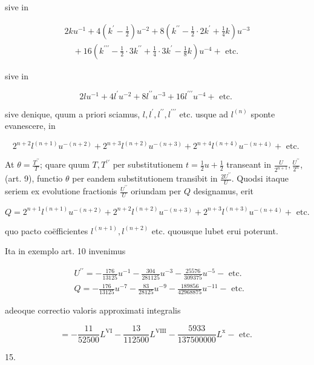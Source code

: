 \documentclass[10pt]{article}
\begin{document}
sive in

\[
\begin{gathered}
2 k u^{-1}+4\left(k^{\prime}-\frac{1}{2}\right) u^{-2}+8\left(k^{\prime \prime}-\frac{1}{2} \cdot 2 k^{\prime}+\frac{1}{4} k\right) u^{-3} \\
\quad+16\left(k^{\prime \prime \prime}-\frac{1}{2} \cdot 3 k^{\prime \prime}+\frac{1}{4} \cdot 3 k^{\prime}-\frac{1}{8} k\right) u^{-4}+\text { etc. }
\end{gathered}
\]

sive in

\[
2 l u^{-1}+4 l^{\prime} u^{-2}+8 l^{\prime \prime} u^{-3}+16 l^{\prime \prime \prime} u^{-4}+\text { etc. }
\]

sive denique, quum a priori sciamus, \(l, l^{\prime}, l^{\prime \prime}, l^{\prime \prime \prime}\) etc. usque ad \(l^{(n)}\) sponte evanescere, in

\[
2^{n+2} l^{(n+1)} u^{-(n+2)}+2^{n+3} l^{(n+2)} u^{-(n+3)}+2^{n+4} l^{(n+4)} u^{-(n+4)}+\text { etc. }
\]

At \(\theta=\frac{T^{\prime \prime}}{T}\); quare quum \(T, T^{\prime \prime}\) per substitutionem \(t=\frac{1}{2} u+\frac{1}{2}\) transeant in \(\frac{U}{2^{n+1}}, \frac{U^{\prime \prime}}{2^{n}}\), (art. 9), functio \(\theta\) per eandem substitutionem transibit in \(\frac{2 U^{\prime \prime}}{U}\). Quodsi itaque seriem ex evolutione fractionis \(\frac{U^{\prime \prime}}{U}\) oriundam per \(Q\) designamus, erit

\[
Q=2^{n+1} l^{(n+1)} u^{-(n+2)}+2^{n+2} l^{(n+2)} u^{-(n+3)}+2^{n+3} l^{(n+3)} u^{-(n+4)}+\text { etc. }
\]

quo pacto coëfficientes \(l^{(n+1)}, l^{(n+2)}\) etc. quousque lubet erui poterunt.

Ita in exemplo art. 10 invenimus

\[
\begin{aligned}
& U^{\prime \prime}=-\frac{176}{13125} u^{-1}-\frac{304}{281125} u^{-3}-\frac{25576}{309375} u^{-5}-\text { etc. } \\
& Q=-\frac{176}{13125} u^{-7}-\frac{83}{28125} u^{-9}-\frac{189856}{42968875} u^{-11}-\text { etc. }
\end{aligned}
\]

adeoque correctio valoris approximati integralis

\[
=-\frac{11}{52500} L^{\mathrm{VI}}-\frac{13}{112500} L^{\mathrm{VIII}}-\frac{5933}{137500000} L^{\mathrm{x}}-\text { etc. }
\]

15.
\end{document}
